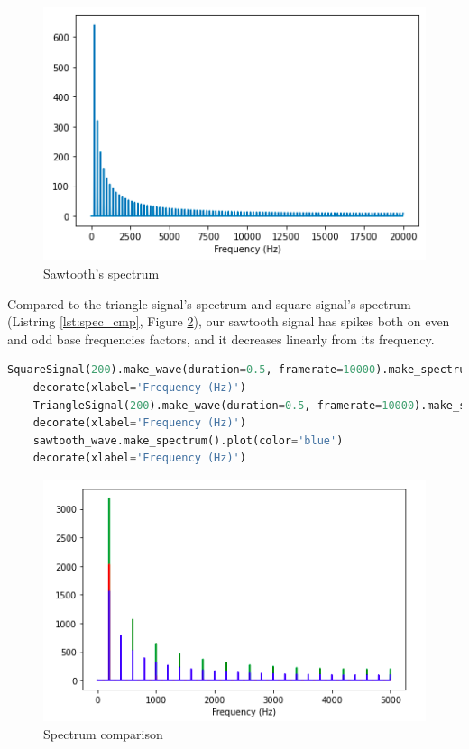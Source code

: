 \documentclass[a4paper]{article}
\begin{document}
        \begin{figure}[H]
          \centering
          \includegraphics[width=\textwidth]{img/sawtooth_spec.png}
          \caption{Sawtooth's spectrum}
          \label{fig:sawtooth_spec}
        \end{figure}

        Compared to the triangle signal's spectrum and square signal's spectrum (Listring \ref{lst:spec_cmp}, Figure \ref{fig:sawtooth_cmp}), our sawtooth signal has spikes both on even and odd base frequencies factors, and it decreases linearly from its frequency.
            
        \begin{lstlisting}[language=Python,caption=Spectrum comparison code,label={lst:spec_cmp}]
    SquareSignal(200).make_wave(duration=0.5, framerate=10000).make_spectrum().plot(color='green')
    decorate(xlabel='Frequency (Hz)')
    TriangleSignal(200).make_wave(duration=0.5, framerate=10000).make_spectrum().plot(color='red')
    decorate(xlabel='Frequency (Hz)')
    sawtooth_wave.make_spectrum().plot(color='blue')
    decorate(xlabel='Frequency (Hz)')
        \end{lstlisting}    
            
        \begin{figure}[H]
            \centering
            \includegraphics[width=\textwidth]{img/sawtooth_cmp.png}
            \caption{Spectrum comparison}
            \label{fig:sawtooth_cmp}
        \end{figure}
        
\end{document}
